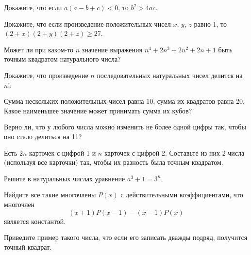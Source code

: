\resetproblem \begingroup %
    \def\jeolmdate{28 ноября 2018}%
\jeolmheader \endgroup


\begin{problems}

\item Докажите, что если $a(a-b+c)<0$, то $b^2>4ac$.

\item Докажите, что если произведение положительных чисел $x$, $y$, $z$ равно 1, то $(2+x)(2+y)(2+z) \geqslant 27$.

\item Может ли при каком-то $n$ значение выражения $n^4 + 2n^3 + 2n^2 + 2n + 1$ быть точным квадратом натурального числа?

\item Докажите, что произведение $n$ последовательных натуральных чисел делится на $n!$.

\item Сумма нескольких положительных чисел равна 10, сумма их квадратов равна 20. Какое наименьшее значение может принимать сумма их кубов?


\item Верно ли, что у любого числа можно изменить не более одной цифры так, чтобы оно стало делиться на 11?

\item Есть $2n$ карточек с цифрой 1 и $n$ карточек с цифрой 2. Составьте из них 2 числа (используя все карточки) так, чтобы их разность была точным квадратом.

\item Решите в натуральных числах уравнение $a^3 + 1 = 3^n$.

\item Найдите все такие многочлены $P(x)$ с действительными коэффициентами, что многочлен $$(x+1) P(x-1) - (x-1)P(x)$$ является константой.


\item Приведите пример такого числа, что если его записать дважды подряд, получится точный квадрат.





\end{problems}